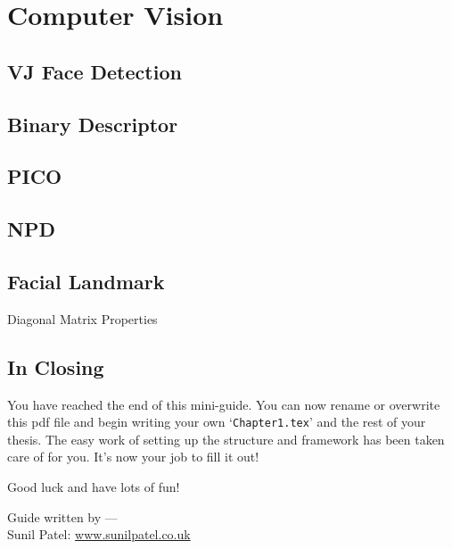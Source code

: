 \chapter{Computer Vision} %

\label{Chapter4} %


\section{VJ Face Detection}
\section{Binary Descriptor}
\section{PICO}
\section{NPD}
\section{Facial Landmark}
\begin{compactitem}

\item Diagonal Matrix Properties
\end{compactitem}


\section{In Closing}

You have reached the end of this mini-guide. You can now rename or overwrite this pdf file and begin writing your own `\texttt{Chapter1.tex}' and the rest of your thesis. The easy work of setting up the structure and framework has been taken care of for you. It's now your job to fill it out!

Good luck and have lots of fun!

\begin{flushright}
Guide written by ---\\
Sunil Patel: \href{http://www.sunilpatel.co.uk}{www.sunilpatel.co.uk}
\end{flushright}
